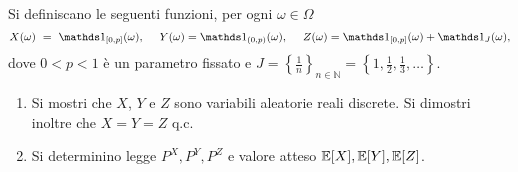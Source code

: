 Si definiscano le seguenti funzioni, per ogni $\omega \in \Omega $
\begin{equation*}
X( \omega ) \ =\ \Ind_{[ 0,p]}( \omega ) ,\ \ \ \ Y( \omega ) =\Ind_{( 0,p)}( \omega ) ,\ \ \ \ Z( \omega ) =\Ind_{[ 0,p]}( \omega ) +\Ind_{J}( \omega ) ,
\end{equation*}
dove $0< p< 1$ è un parametro fissato e $J=\left\{\frac{1}{n}\right\}_{n\in \mathbb{N}} =\left\{1,\frac{1}{2} ,\frac{1}{3} ,\dots \right\}$.
\begin{enumerate}
\item Si mostri che $X$, $Y$ e $Z$ sono variabili aleatorie reali discrete. Si dimostri inoltre che $X=Y=Z$ q.c.
\item Si determinino legge $P^{X} ,P^{Y} ,P^{Z}$ e valore atteso $\mathbb{E}[ X] ,\mathbb{E}[ Y] ,\mathbb{E}[ Z]$.
\end{enumerate}

\Esercizio{}

